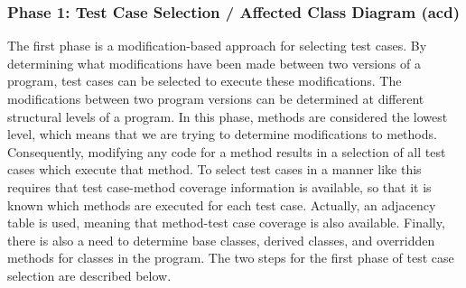 \documentclass[a4paper,english,12pt]{report}
\begin{document}
\subsubsection{Phase 1: Test Case Selection / Affected Class Diagram (\gls{acd})}
The first phase is a modification-based approach for selecting test cases. By determining what modifications have been made between two versions of a program, test cases can be selected to execute these modifications. The modifications between two program versions can be determined at different structural levels of a program. In this phase, methods are considered the lowest level, which means that we are trying to determine modifications to methods. Consequently, modifying any code for a method results in a selection of all test cases which execute that method. To select test cases in a manner like this requires that test case-method coverage information is available, so that it is known which methods are executed for each test case. Actually, an adjacency table is used, meaning that method-test case coverage is also available. Finally, there is also a need to determine base classes, derived classes, and overridden methods for classes in the program. The two steps for the first phase of test case selection are described below.
\end{document}
